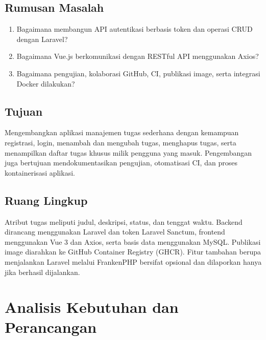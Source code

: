 \documentclass[12pt,a4paper]{report}
\begin{document}
\section{Rumusan Masalah}
\begin{enumerate}
\item Bagaimana membangun API autentikasi berbasis token dan operasi CRUD dengan Laravel?
\item Bagaimana Vue.js berkomunikasi dengan RESTful API menggunakan Axios?
\item Bagaimana pengujian, kolaborasi GitHub, CI, publikasi image, serta integrasi Docker dilakukan?
\end{enumerate}
\section{Tujuan}
Mengembangkan aplikasi manajemen tugas sederhana dengan kemampuan registrasi, login, menambah dan mengubah tugas, menghapus tugas, serta menampilkan daftar tugas khusus milik pengguna yang masuk. Pengembangan juga bertujuan mendokumentasikan pengujian, otomatisasi CI, dan proses kontainerisasi aplikasi.
\section{Ruang Lingkup}
Atribut tugas meliputi judul, deskripsi, status, dan tenggat waktu. Backend dirancang menggunakan Laravel dan token Laravel Sanctum, frontend menggunakan Vue 3 dan Axios, serta basis data menggunakan MySQL. Publikasi image diarahkan ke GitHub Container Registry (GHCR). Fitur tambahan berupa menjalankan Laravel melalui FrankenPHP bersifat opsional dan dilaporkan hanya jika berhasil dijalankan.

\chapter{Analisis Kebutuhan dan Perancangan}
\end{document}
